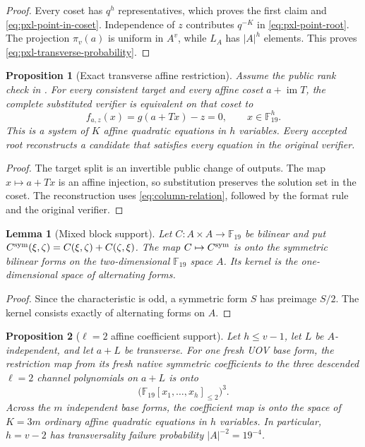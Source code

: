 \documentclass[11pt]{article}
\newtheorem{lemma}[lemma]{Lemma}
\newtheorem{proposition}[proposition]{Proposition}
\newcommand{\F}{\mathbb F}
\newcommand{\im}{\operatorname{im}}
\begin{document}
\begin{proof}
Every coset has $q^h$ representatives, which proves the first claim and
\eqref{eq:pxl-point-in-coset}.  Independence of $z$ contributes $q^{-K}$ in
\eqref{eq:pxl-point-root}.  The projection $\pi_v(a)$ is uniform in $A^v$,
while $L_A$ has $|A|^h$ elements.  This proves
\eqref{eq:pxl-transverse-probability}.
\end{proof}

\begin{proposition}[Exact transverse affine restriction]
\label{prop:pxl-level1-transverse}
Assume the public rank check in .  For every
consistent target and every affine coset $a+\im T$, the complete substituted
verifier is equivalent on that coset to
\begin{equation}
 f_{a,z}(x)=g(a+Tx)-z=0,
 \qquad x\in\F_{19}^{h}.                             \label{eq:pxl-restricted-system}
\end{equation}
This is a system of $K$ affine quadratic equations in $h$ variables.  Every
accepted root reconstructs a candidate that satisfies every equation in the
original verifier.
\end{proposition}

\begin{proof}
The target split is an invertible public change of outputs.  The map
$x\mapsto a+Tx$ is an affine injection, so substitution preserves the
solution set in the coset.  The reconstruction uses
\eqref{eq:column-relation}, followed by the format rule and the original
verifier.
\end{proof}

\begin{lemma}[Mixed block support]
\label{lem:pxl-l2-mixed-block}
Let $C:A\times A\to\F_{19}$ be bilinear and put
$C^{\rm sym}(\xi,\zeta)=C(\xi,\zeta)+C(\zeta,\xi)$.  The map
$C\mapsto C^{\rm sym}$ is onto the symmetric bilinear forms on the
two-dimensional $\F_{19}$ space $A$.  Its kernel is the one-dimensional
space of alternating forms.
\end{lemma}

\begin{proof}
Since the characteristic is odd, a symmetric form $S$ has preimage $S/2$.
The kernel consists exactly of alternating forms on $A$.
\end{proof}

\begin{proposition}[$\ell=2$ affine coefficient support]
\label{prop:pxl-l2-affine-support}
Let $h\le v-1$, let $L$ be $A$-independent, and let $a+L$ be transverse.
For one fresh UOV base form, the restriction map from its fresh native
symmetric coefficients to the three descended $\ell=2$ channel polynomials
on $a+L$ is onto
\begin{equation}
  \bigl(\F_{19}[x_1,\ldots,x_h]_{\le2}\bigr)^3.      \label{eq:pxl-l2-affine-surjection}
\end{equation}
Across the $m$ independent base forms, the coefficient map is onto the space
of $K=3m$ ordinary affine quadratic equations in $h$ variables.  In
particular, $h=v-2$ has transversality failure probability
$|A|^{-2}=19^{-4}$.
\end{proposition}
\end{document}
